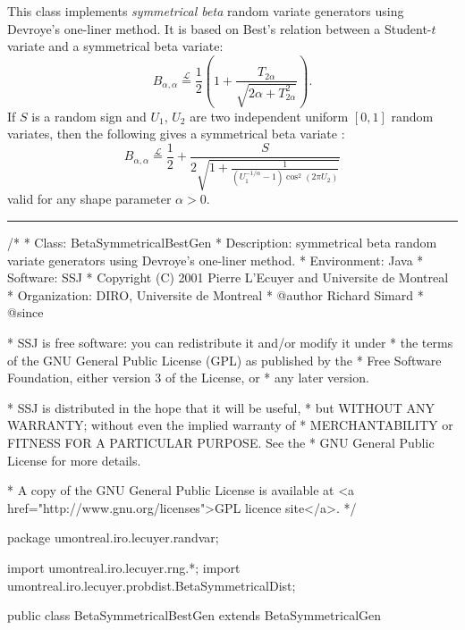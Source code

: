 
This class implements {\em symmetrical beta\/} random variate generators using
Devroye's one-liner method. It is based on Best's relation  \cite{rBES78a} 
between a Student-$t$ variate and a symmetrical beta variate:
\[
  B_{\alpha, \alpha} \stackrel{\mathcal L}{=} \frac 1 2 \left(
  1 + \frac{T_{2\alpha}}{\sqrt{2\alpha + T_{2\alpha}^2}}\right).
\]
If $S$ is a random sign and $U_1$, $U_2$ are two independent uniform $[0,1]$
random variates, then the following gives a symmetrical
 beta variate \cite{rDEV96a}:
\begin{equation}
  B_{\alpha, \alpha} \stackrel{\mathcal L}{=} \frac 1 2 + \frac{S}{2
  \sqrt{1 + \frac{1}{\left(U_1^{-1/\alpha} - 1\right)\cos^2(2\pi U_2)}}}
\label{eq.beta.best}
\end{equation}
valid for any shape parameter $\alpha > 0$.



\bigskip\hrule

\begin{code}
\begin{hide}
/*
 * Class:        BetaSymmetricalBestGen
 * Description:  symmetrical beta random variate generators using
                 Devroye's one-liner method.
 * Environment:  Java
 * Software:     SSJ 
 * Copyright (C) 2001  Pierre L'Ecuyer and Universite de Montreal
 * Organization: DIRO, Universite de Montreal
 * @author       Richard Simard
 * @since

 * SSJ is free software: you can redistribute it and/or modify it under
 * the terms of the GNU General Public License (GPL) as published by the
 * Free Software Foundation, either version 3 of the License, or
 * any later version.

 * SSJ is distributed in the hope that it will be useful,
 * but WITHOUT ANY WARRANTY; without even the implied warranty of
 * MERCHANTABILITY or FITNESS FOR A PARTICULAR PURPOSE.  See the
 * GNU General Public License for more details.

 * A copy of the GNU General Public License is available at
   <a href="http://www.gnu.org/licenses">GPL licence site</a>.
 */
\end{hide}
package umontreal.iro.lecuyer.randvar;\begin{hide}
import umontreal.iro.lecuyer.rng.*;
import umontreal.iro.lecuyer.probdist.BetaSymmetricalDist;
\end{hide}

public class BetaSymmetricalBestGen extends BetaSymmetricalGen \begin{hide} {
   private RandomStream stream2;
   private RandomStream stream3;
   private double afactor;          // = 1/alpha
   private static final double TWOPI = 2.0*Math.PI;      // = 2 Pi
\end{hide}
\end{code}


